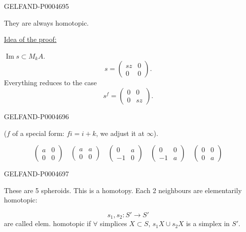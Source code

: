 \begin{GelfandAdjacentEvidence}{GELFAND-P000469}{5}


They are always homotopic.

\uline{Idea of the proof:}

$\operatorname{Im}s\subset M_kA$.
\[
s=\left(\begin{array}{c|c}sz&0\\\hline 0&0\end{array}\right).
\]
Everything reduces to the case
\[
s^f=\left(\begin{array}{c|c}0&0\\\hline 0&sz\end{array}\right).
\]
\end{GelfandAdjacentEvidence}
\begin{GelfandAdjacentEvidence}{GELFAND-P000469}{6}


($f$ of a special form: $fi=i+k$, we adjust it at $\infty$).

\[
\begin{pmatrix}a&0\\0&0\end{pmatrix}\quad
\begin{pmatrix}a&a\\0&0\end{pmatrix}\quad
\begin{pmatrix}0&a\\-1&0\end{pmatrix}\quad
\begin{pmatrix}0&0\\-1&a\end{pmatrix}\quad
\begin{pmatrix}0&0\\0&a\end{pmatrix}
\]
\end{GelfandAdjacentEvidence}
\begin{GelfandAdjacentEvidence}{GELFAND-P000469}{7}

These are 5 spheroids. This is a homotopy. Each 2 neighbours are elementarily homotopic:

\[
s_1,s_2\colon S'\longrightarrow S'
\]
are called elem. homotopic if $\forall$ simplices $X\subset S$, $s_1X\cup s_2X$
is a simplex in $S'$.
\end{GelfandAdjacentEvidence}
